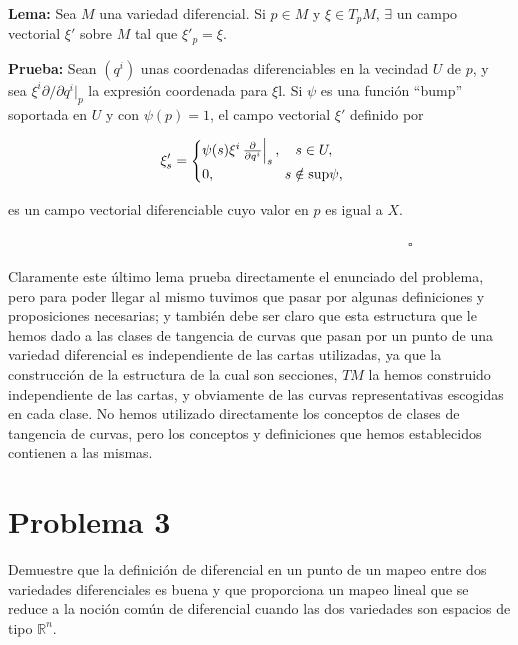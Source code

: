 \documentclass[a4paper,10pt]{article}
\numberwithin{equation}{section}
\newcommand{\zerodel}{.\kern-\nulldelimiterspace}
\newcommand{\lema}{\textbf{Lema: }}
\newcommand{\prueba}{\textbf{Prueba: }}
\begin{document}
\lema Sea $M$ una variedad diferencial. Si $p \in M$ y $\xi \in T_p M$, $\exists$ un 
campo vectorial $\xi'$ sobre $M$ tal que $\xi'_p = \xi$.

\vspace{.3cm}

\prueba Sean $(q^i)$ unas coordenadas diferenciables en la vecindad $U$ de $p$, y 
sea $\xi^i \partial/\partial q^i|_p$ la expresión coordenada para $\xi$l. Si $\psi$ 
es una función ``bump'' \cite{curtis} soportada en $U$ y con $\psi(p) = 1$, el 
campo vectorial $\xi'$ definido por 

\begin{equation}
 \xi'_s = \begin{cases}
           \psi(s)\xi^i \left\zerodel\frac{\partial}{\partial q^i}\right|_s, \quad s \in U, \\
           0, \qquad \qquad \quad s \notin \text{sup} \psi,
          \end{cases}
\end{equation}

es un campo vectorial diferenciable cuyo valor en $p$ es igual a $X$.

$\hspace{12cm} \square$

\vspace{.3cm}

Claramente este último lema prueba directamente el enunciado del problema, pero para 
poder llegar al mismo tuvimos que pasar por algunas definiciones y proposiciones 
necesarias; y también debe ser claro que esta estructura que le hemos dado a las 
clases de tangencia de curvas que pasan por un punto de una variedad diferencial 
es independiente de las cartas utilizadas, ya que la construcción de la estructura 
de la cual son secciones, $TM$ la hemos construido independiente de las cartas, y 
obviamente de las curvas representativas escogidas en cada clase. No hemos utilizado 
directamente los conceptos de clases de tangencia de curvas, pero los conceptos y 
definiciones que hemos establecidos contienen a las mismas.


\section{Problema 3}

Demuestre que la definición de diferencial en un punto de un mapeo entre dos variedades 
diferenciales es buena y que proporciona un mapeo lineal que se reduce a la noción 
común de diferencial cuando las dos variedades son espacios de tipo $\mathbb{R}^n$.
\end{document}
